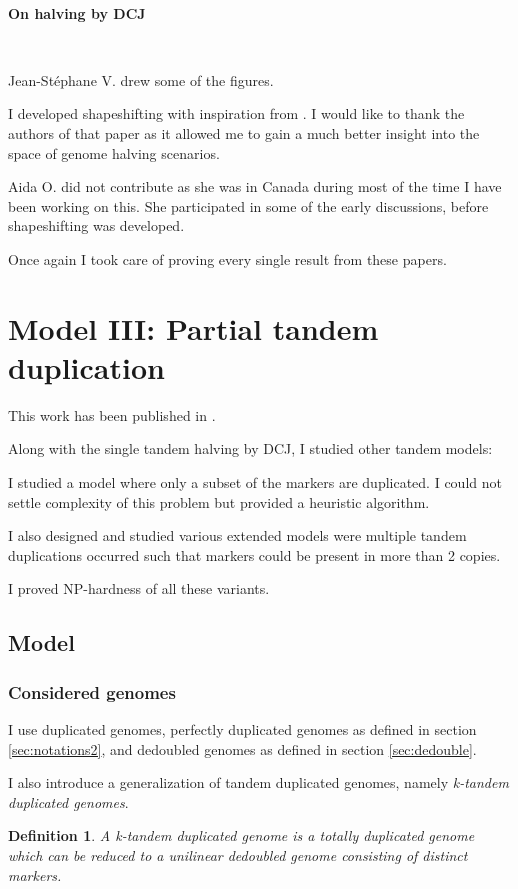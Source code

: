 \documentclass[11pt,final,twoside,nofrench]{thlifl}
\newtheorem{definition}{Definition}
\begin{document}
{~

\textbf{On halving by DCJ}

~~

Jean-Stéphane V. drew some of the figures.

I developed shapeshifting with inspiration from \cite{Kovac}. I would like to thank the authors of that paper as it allowed me to gain a much better insight into the space of genome halving scenarios.

Aida O. did not contribute as she was in Canada during most of the time I have been working on this. She participated in some of the early discussions, before shapeshifting was developed.

Once again I took care of proving every single result from these papers.

\section{Model III: Partial tandem duplication}
\label{sec:partialdup}

This work has been published in \cite{Thomas12}. 

Along with the single tandem halving by DCJ, I studied other tandem models:

I studied a model where only a subset of the markers are duplicated. I could not settle complexity of this problem but provided a heuristic algorithm.

I also designed and studied various extended models were multiple tandem duplications occurred such that markers could be present in more than 2 copies.

I proved NP-hardness of all these variants.

\subsection{Model}

\subsubsection{Considered genomes}

I use duplicated genomes, perfectly duplicated genomes as defined in section \ref{sec:notations2}, and dedoubled genomes as defined in section \ref{sec:dedouble}.

I also introduce a generalization of tandem duplicated genomes, namely \emph{k-tandem duplicated genomes}.

\begin{definition}
A \emph{k-tandem duplicated genome} is a totally duplicated genome which can
be reduced to a unilinear dedoubled genome consisting of  distinct markers.
\end{definition}

}
\end{document}
